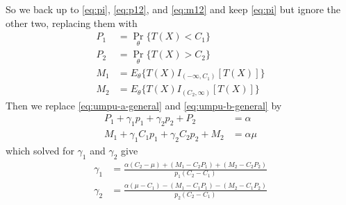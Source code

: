 \documentclass{article}
\DeclareMathOperator{\pr}{Pr}
\begin{document}
So we back up to \eqref{eq:pi}, \eqref{eq:p12}, and \eqref{eq:m12}
and keep \eqref{eq:pi} but ignore the other two, replacing them with
\begin{subequations}
\begin{align}
   P_1 & = \pr_\theta\{ T(X) < C_1 \}
   \label{eq:P1}
   \\
   P_2 & = \pr_\theta\{ T(X) > C_2 \}
   \label{eq:P2}
   \\
   M_1 & = E_\theta\{ T(X) I_{(- \infty, C_1)}[T(X)] \}
   \label{eq:M1}
   \\
   M_2 & = E_\theta\{ T(X) I_{(C_2, \infty)}[T(X)] \}
   \label{eq:M2}
\end{align}
\end{subequations}
Then we replace \eqref{eq:umpu-a-general} and \eqref{eq:umpu-b-general} by
\begin{subequations}
\begin{align}
   P_1 + \gamma_1 p_1 + \gamma_2 p_2 + P_2
   & = \alpha
   \label{eq:umpu-a-general-too}
   \\
   M_1 +  \gamma_1 C_1 p_1 + \gamma_2 C_2 p_2 + M_2
   & = \alpha \mu
   \label{eq:umpu-b-general-too}
\end{align}
\end{subequations}
which solved for $\gamma_1$ and $\gamma_2$ give
\begin{subequations}
\begin{align}
   \gamma_1
   & =
   \frac{\alpha (C_2 - \mu) + (M_1 - C_2 P_1) + (M_2 - C_2 P_2)}
   {p_1 (C_2 - C_1)}
   \label{eq:gamma-1-too}
   \\
   \gamma_2
   & =
   \frac{\alpha (\mu - C_1) - (M_1 - C_1 P_1) - (M_2 - C_1 P_2)}
   {p_2 (C_2 - C_1)}
   \label{eq:gamma-2-too}
\end{align}
\end{subequations}
%
%
%
%
%
\end{document}
